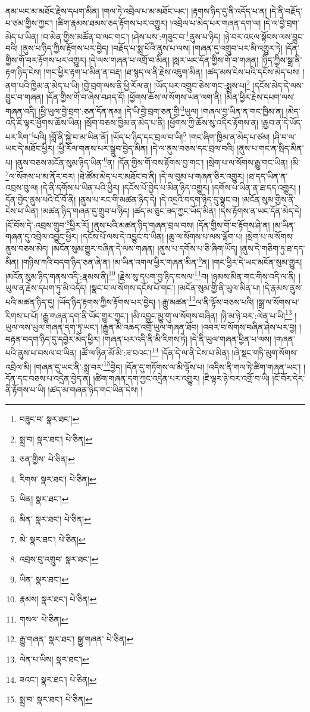 ནམ་ཡང་མ་མཐོང་རྗེས་དཔག་མིན། །གལ་ཏེ་འབྲེལ་པ་མ་མཐོང་ཡང་། །རྟགས་ཉིད་དུ་ནི་འདོད་པ་ན། །དེ་ནི་བརྗོད་པ་ཙམ་གྱིས་ཀྱང་། །ཚིག་རྣམས་ཐམས་ཅད་རྟོགས་པར་འགྱུར། །འབྲེལ་པ་མེད་པར་གཞན་དག་ལ། །དེ་ལ་བྱེ་བྲག་མེད་པ་ཡིན། །བ་མེན་གྱིས་མཚོན་བ་ལང་གང་། །ཤེས་པས་:གཟུང་བ་\footnote{བཟུང་བ་  སྣར་ཐང་། }ནུས་པ་ཉིད། །ཉེ་བར་འཇལ་སྟོབས་ལས་བྱུང་བའི། །ནུས་པ་ཉིད་ཀྱིས་རྟོགས་པར་བྱེད། །བརྗོད་པ་སྨྲ་པོའི་ནུས་པ་ལས། །གཞན་དུ་འགྲུབ་པར་མི་འགྱུར་ཏེ། །དོན་གྱིས་གོ་བར་རྟོགས་པར་འགྱུར། །དེ་ལས་གཞན་པ་འགྲོ་བ་མིན། །སླར་ཡང་དོན་གྱིས་གོ་བ་གཞན། །ཉིད་ཀྱིས་སྒྲ་ནི་རྟག་ཉིད་ངེས། །གང་ཕྱིར་རྟག་པ་མིན་ན་བརྡ། །ཐ་སྙད་ལ་ནི་རྗེས་འཇུག་མིན། །ཚད་མས་ངེས་པའི་དངོས་མེད་པས། །ནག་པའི་ཁྱིམ་ན་མེད་པ་ཡི། །བྱེ་བྲག་ལས་ནི་ཕྱི་རོལ་ན། །ཡོད་པར་འགྲུབ་ཅེས་གང་:སྨྲས་པ།\footnote{སྨྲ་བ།  སྣར་ཐང་།  པེ་ཅིན། } །དངོས་མེད་དེ་ལས་བྱུང་བ་གཞན། །དོན་གྱིས་གོ་བ་ཞེས་བཤད་དོ། །ཕྱོགས་ཆོས་ལ་སོགས་ཡན་ལག་ནི། །མིན་ཕྱིར་རྗེས་དཔག་ལས་གཞན་འདི། །ཕྱི་ཡུལ་བྱེ་བྲག་:ཅན་དོན་ནམ། །དེ་ཡི་བྱེ་བྲག་ཅན་གྱི་\footnote{ཅན་གྱིས་  པེ་ཅིན། }ཡུལ། །གཞལ་བྱ་ཡིན་ན་གང་ཁྱིམ་ན། །མེད་འདི་ཇི་ལྟར་ཕྱོགས་ཆོས་ཡིན། །སྲོག་བཅས་ཁྱིམ་ན་མེད་པ་ནི། །ཕྱོགས་ཀྱི་ཆོས་སུ་འདིར་རྟོགས་ན། །རྒྱབ་ན་དེ་ཡོད་པར་རིག་\footnote{རིགས་  སྣར་ཐང་།  པེ་ཅིན། }པའི། །བློ་ནི་སྐྱེ་བ་མ་ཡིན་ནོ། །ཡོད་པ་ཉིད་དང་བྲལ་བ་ཡི།\footnote{ཡིན།  སྣར་ཐང་། } །གང་ཞིག་ཁྱིམ་ན་མེད་པ་ཙམ། །ཤི་བ་ལ་ཡང་དེ་མཐོང་ཕྱིར། །ཕྱི་རོལ་གནས་པར་སྒྲུབ་བྱེད་མིན། །དེ་ལ་ནུས་བཅས་དང་བྲལ་བའི། །ནུས་པ་གང་ན་སྲིད་མིན་པ། །ནུས་བཅས་མངོན་སུམ་ཉིད་ཡིན་\footnote{མིན་  སྣར་ཐང་།  པེ་ཅིན། }ན། །དོན་གྱིས་གོ་བས་རྟོགས་བྱ་གང་། །སྲེག་པ་ལ་སོགས་རྒྱུ་གང་ཡིན། །མི་\footnote{མེ་  སྣར་ཐང་།  པེ་ཅིན། }ལ་སོགས་པ་མ་ནོར་བར། །ཐེ་ཚོམ་མེད་པར་མཐོང་བ་ནི། །དེ་ལ་བུམ་པ་གཞན་ཅིར་འགྱུར། །ཐ་དད་ཡིན་ན་འབྲས་བུ་ལ། །དེ་ནི་དགོས་པ་ཡིན་པའི་ཕྱིར། །དངོས་པོ་བྱེད་པ་མིན་ཉིད་འགྱུར། །དགོས་པ་ཡིན་ན་ཐ་དད་འགྱུར། །
དོན་བྱེད་ནུས་པའི་ངོ་བོ་ནི། །ནུས་པ་རང་གི་མཚན་ཉིད་དེ། །དེ་འདྲའི་བདག་ཉིད་དུ་སྣང་བ། །མངོན་སུམ་གྱིས་ནི་ངེས་པ་ཡིན། །མཚན་ཉིད་གཞན་དུ་གྲུབ་པ་ཉིད། །ཚད་མ་ཅུང་ཟད་ཀྱང་ཡོད་མིན། །དེས་རྟོགས་ན་ཡང་དོན་མེད་དེ། །ངོ་བོས་དེ་:འབྲས་གྲུབ་\footnote{འབྲས་བུ་འགྲུབ་  སྣར་ཐང་། }ཕྱིར་རོ། །ནུས་པའི་མཚན་ཉིད་གཞན་བྲལ་བས། །དོན་གྱིས་གོ་བ་རྟོགས་ཤེ་ན། །མ་ཡིན་གཞན་དུ་འབྲེལ་འབྱུང་ཕྱིར། །དངོས་པོ་ལས་དེ་འབྱུང་བ་ཡིན། །ཆུ་ལ་སོགས་པ་ལས་ལྡོག་པ། །སྲེག་པ་ལ་སོགས་ནུས་བཅས་མེད། །མངོན་སུམ་གྱུར་བཞིན་དེ་ལས་གཞན། །ནུས་པ་དགོས་པ་ཅི་ཞིག་ཡོད། །ནུས་དེ་གཅིག་ཏུ་ཐ་དད་མིན། །གཉིས་ཀའི་བདག་ཉིད་ཅན་ཞེ་ན། །མ་ཡིན་འགལ་ཕྱིར་གཞན་མིན་\footnote{ཡིན་  སྣར་ཐང་། }ན། །གང་ཕྱིར་དེ་ཡང་མངོན་སུམ་གྱུར། །མངོན་སུམ་ཉིད་གནས་འདི་:རྣམས་ནི།\footnote{རྣམས།  སྣར་ཐང་།  པེ་ཅིན། } །རྗེས་སུ་དཔག་བྱ་ཉིད་བསལ་\footnote{གསལ་  པེ་ཅིན། }བ། །ཉམས་མིན་གང་གིས་འདི་ལ་ནི། །ཡུལ་ན་རྗེས་དཔག་ཏུ་མི་འདོད། །སྣང་བ་ལ་སོགས་དངོས་པོ་གང་། །མངོན་སུམ་གྱི་ནི་ཡུལ་མིན་པ། །དེ་རྣམས་ནུས་པའི་མཚན་ཉིད་དུ། །ཡོད་ཉིད་རྟགས་ཀྱིས་རྟོགས་པར་བྱེད། །:རྒྱུ་མཚན་\footnote{རྒྱུ་གཞན་  སྣར་ཐང་། སྒྱུ་གཞན་  པེ་ཅིན། }ལ་ནི་ལྟོས་བཅས་པའི། །སྒྲ་ལ་སོགས་པ་རིགས་པ་པོ། །རྒྱུ་གཞན་དག་ནི་ཡོད་གྱུར་ཀྱང་། །མི་འབྱུང་མྱུ་གུ་ལ་སོགས་བཞིན། །ཉི་མ་ཉེ་བར་:ལེན་པ་ཡི།\footnote{ལེན་པ་ཡིས།  སྣར་ཐང་། } །ཡུལ་ལས་ཡུལ་གཞན་དག་ཏུ་ཡང་། །རྒྱུན་མི་འཆད་འགྲོ་ཡུལ་གཞན་ཐོབ། །འབར་བ་སོགས་བཞིན་ཤེས་པར་བྱ། །བརྟན་བདག་ཉིད་དུ་དབྱེར་མེད་ཕྱིར། །གཞན་པར་འདི་ནི་མི་རིགས་ཏེ། །དེ་ནི་ཡུལ་གཞན་ཕྱིན་པ་ལས། །གཞན་པའི་ནུས་པ་བསལ་བ་ཡིན། །ཚོ་ལ་ཉིན་མོ་མི་:ཟ་བའང་།\footnote{ཟའང་།  སྣར་ཐང་།  པེ་ཅིན། } །དོན་དེ་ལ་ནི་ངེས་པ་མིན། །ཞེ་སྡང་གཏི་མུག་སོགས་འབྲེལ་མི། །གཞན་དུ་ཡང་ནི་:སྨྲ་བར་\footnote{སྨྲ་བ་  སྣར་ཐང་།  པེ་ཅིན། }བྱེད། །དོན་དུ་གཏོགས་ལ་མི་ལྟོས་པ། །འདིས་ནི་གལ་ཏེ་ཚིག་གཞན་ཡང་། །དོན་དང་བཅས་པ་འདྲེན་བྱེད་ན། །ཚིག་གཞན་དག་ཀྱང་འདྲེན་པར་འགྱུར། །ཇི་ལྟར་ཉེ་བར་འགྲོ་བ་ཡི། །ངོ་བོར་དེར་ནི་རྟོགས་པ་ཡི། །ཚད་མ་གཞན་ཉིད་གང་ཡིན་དེས། །
